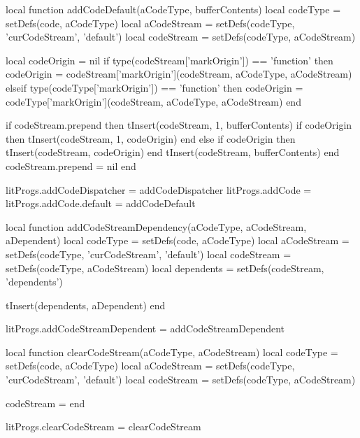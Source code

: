 local function addCodeDefault(aCodeType, bufferContents)
  local codeType        = setDefs(code, aCodeType)
  local aCodeStream     = setDefs(codeType, 'curCodeStream', 'default')
  local codeStream      = setDefs(codeType, aCodeStream)

  local codeOrigin      = nil
    if type(codeStream['markOrigin']) == 'function' then
      codeOrigin =
        codeStream['markOrigin'](codeStream, aCodeType, aCodeStream)
    elseif type(codeType['markOrigin']) == 'function' then
      codeOrigin =
        codeType['markOrigin'](codeStream, aCodeType, aCodeStream)
    end

  if codeStream.prepend then
    tInsert(codeStream, 1, bufferContents)
    if codeOrigin then
      tInsert(codeStream, 1, codeOrigin)
    end
  else
    if codeOrigin then
      tInsert(codeStream, codeOrigin)
    end
    tInsert(codeStream, bufferContents)
  end
  codeStream.prepend = nil
end

litProgs.addCodeDispatcher = addCodeDispatcher
litProgs.addCode           = {}
litProgs.addCode.default   = addCodeDefault

local function addCodeStreamDependency(aCodeType, aCodeStream, aDependent)
  local codeType        = setDefs(code, aCodeType)
  local aCodeStream     = setDefs(codeType, 'curCodeStream', 'default')
  local codeStream      = setDefs(codeType, aCodeStream)
  local dependents      = setDefs(codeStream, 'dependents')

  tInsert(dependents, aDependent)
end

litProgs.addCodeStreamDependent = addCodeStreamDependent

local function clearCodeStream(aCodeType, aCodeStream)
  local codeType        = setDefs(code, aCodeType)
  local aCodeStream     = setDefs(codeType, 'curCodeStream', 'default')
  local codeStream      = setDefs(codeType, aCodeStream)

  codeStream = { }
end

litProgs.clearCodeStream = clearCodeStream

